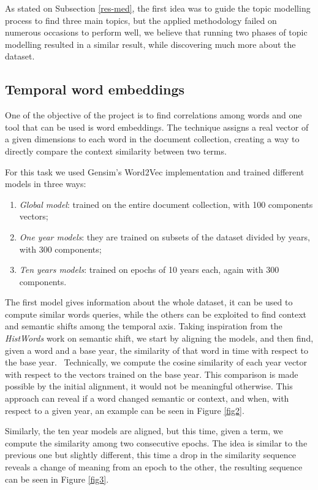 As stated on Subsection \vref{res-med}, the first idea was to guide the topic modelling
process to find three main topics, but the applied methodology failed on numerous occasions to 
perform well, we believe that running two phases of topic modelling resulted in a similar result, 
while discovering much more about the dataset. 
\subsection{Temporal word embeddings}

One of the objective of the project is to find correlations among words and one tool 
that can be used is word embeddings. The technique assigns a real vector of a given dimensions
to each word in the document collection, creating a way to directly compare the context 
similarity between two terms.

For this task we used Gensim's Word2Vec implementation and trained different models 
in three ways:
\begin{enumerate}
    \item \emph{Global model}: trained on the entire document collection, with 100 components vectors;
    \item \emph{One year models}: they are trained on subsets of the dataset divided by years, with 300 components;
    \item \emph{Ten years models}: trained on epochs of 10 years each, again with 300 components.
\end{enumerate}
The first model gives information about the whole dataset, it can be used to compute 
similar words queries, while the others can be exploited to find context and semantic shifts 
among the temporal axis.
Taking inspiration from the \emph{HistWords} work on semantic shift, we start by aligning the models, 
and then find, given a word and a base year, the similarity of that word in time with respect 
to the base year.~\cite{hist-words} 
Technically, we compute the cosine similarity of each year vector 
with respect to the vectors trained on the base year. This comparison is made possible by the 
initial alignment, it would not be meaningful otherwise.
This approach can reveal if a word changed semantic or context, and when, 
with respect to a given year, an example can be seen in Figure \vref{fig2}.

Similarly, the ten year models are aligned, but this time, given a term, we compute the 
similarity among two consecutive epochs. The idea is similar to the previous one but slightly 
different, this time a drop in the similarity sequence 
reveals a change of meaning from an epoch to the other, the resulting 
sequence can be seen in Figure \vref{fig3}.

